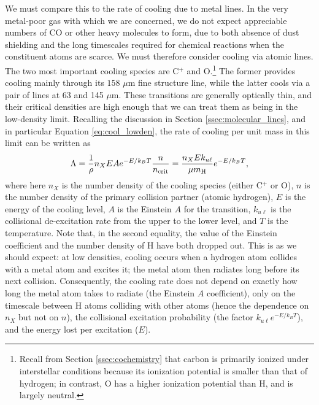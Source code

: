 We must compare this to the rate of cooling due to metal lines. In the very metal-poor gas with which we are concerned, we do not expect appreciable numbers of CO or other heavy molecules to form, due to both absence of dust shielding and the long timescales required for chemical reactions when the constituent atoms are scarce. We must therefore consider cooling via atomic lines. The two most important cooling species are C$^+$ and O.\footnote{Recall from Section \ref{ssec:cochemistry} that carbon is primarily ionized under interstellar conditions because its ionization potential is smaller than that of hydrogen; in contrast, O has a higher ionization potential than H, and is largely neutral.} The former provides cooling mainly through its $158$ $\mu$m fine structure line, while the latter cools via a pair of lines at 63 and 145 $\mu$m. These transitions are generally optically thin, and their critical densities are high enough that we can treat them as being in the low-density limit. Recalling the discussion in Section \ref{ssec:molecular_lines}, and in particular Equation \ref{eq:cool_lowden}, the rate of cooling per unit mass in this limit can be written as
\begin{equation}
\Lambda = \frac{1}{\rho}n_X E A e^{-E/k_BT} \frac{n}{n_{\rm crit}} = \frac{n_X E k_{u\ell}}{\mu m_{\rm H}} e^{-E/k_B T},
\end{equation}
where here $n_X$ is the number density of the cooling species (either C$^+$ or O), $n$ is the number density of the primary collision partner (atomic hydrogen), $E$ is the energy of the cooling level, $A$ is the Einstein $A$ for the transition, $k_{u\ell}$ is the collisional de-excitation rate from the upper to the lower level, and $T$ is the temperature. Note that, in the second equality, the value of the Einstein coefficient and the number density of H have both dropped out. This is as we should expect: at low densities, cooling occurs when a hydrogen atom collides with a metal atom and excites it; the metal atom then radiates long before its next collision. Consequently, the cooling rate does not depend on exactly how long the metal atom takes to radiate (the Einstein $A$ coefficient), only on the timescale between H atoms colliding with other atoms (hence the dependence on $n_X$ but not on $n$), the collisional excitation probability (the factor $k_{u\ell} e^{-E/k_B T}$), and the energy lost per excitation ($E$).

